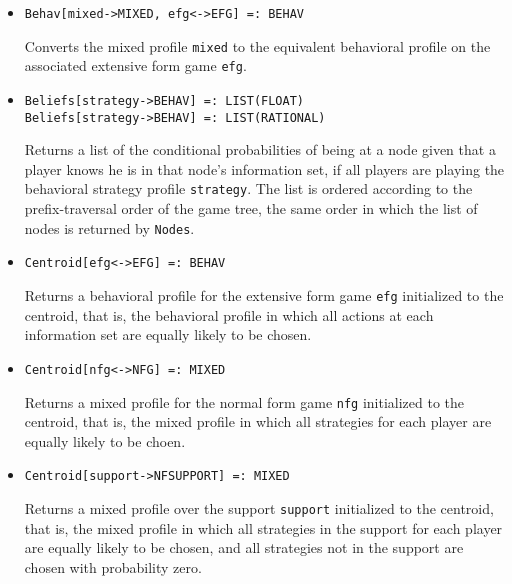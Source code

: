 \begin{itemize}

\item
\protect \large \begin{verbatim}
Behav[mixed->MIXED, efg<->EFG] =: BEHAV
\end{verbatim}\normalsize

\bd
Converts the mixed profile \verb+mixed+ to the equivalent
behavioral profile on the associated extensive form game \verb+efg+.
\ed

\item
\protect \large \begin{verbatim}
Beliefs[strategy->BEHAV] =: LIST(FLOAT)
Beliefs[strategy->BEHAV] =: LIST(RATIONAL)
\end{verbatim}\normalsize

\bd
Returns a list of the conditional probabilities of
being at a node given that a player knows he is in that node's information
set, if all players are playing the behavioral strategy profile
\verb+strategy+.  The list is ordered according to the prefix-traversal
order of the game tree, the same order in which the list of nodes is
returned by {\tt Nodes}.
\ed



\item
\protect \large \begin{verbatim} 
Centroid[efg<->EFG] =: BEHAV
\end{verbatim}\normalsize

\bd
Returns a behavioral profile for the extensive form
game \verb+efg+ initialized to the centroid, that is, the behavioral
profile in which all actions at each information set are equally
likely to be chosen.
\ed

\item
\protect \large \begin{verbatim}
Centroid[nfg<->NFG] =: MIXED
\end{verbatim}\normalsize

\bd
Returns a mixed profile for the normal form game \verb+nfg+
initialized to the centroid, that is, the mixed profile in which all
strategies for each player are equally likely to be choen.
\ed

\item
\protect \large \begin{verbatim}
Centroid[support->NFSUPPORT] =: MIXED
\end{verbatim}\normalsize

\bd
Returns a mixed profile over the support \verb+support+
initialized to the centroid, that is, the mixed profile in which 
all strategies in the support for each player are equally likely to be
chosen, and all strategies not in the support are chosen with probability
zero.
\ed


\end{itemize}
